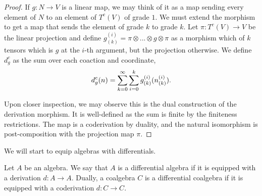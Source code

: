 \documentclass[../thesis.tex]{subfiles}
\begin{document}
\begin{proof}
                If $g: N \rightarrow V$ is a linear map, we may think of it as a map sending every element of $N$ to an element of $T^c(V)$ of grade $1$. We must extend the morphism to get a map that sends the element of grade $k$ to grade $k$. Let $\pi: T^c(V) \rightarrow V$ be the linear projection and define $g_{(k)}^{(i)} = \pi\otimes ... \otimes g \otimes \pi$ as a morphism which of $k$ tensors which is $g$ at the $i$-th argument, but the projection otherwise. We define $d_g^c$ as the sum over each coaction and coordinate,
                \begin{align*}
                    d_g^c(n) = \sum_{k=0}^\infty \sum_{i=0}^k g_{(k)}^{(i)}(n_{(k)}^{(i)})\tt{.}
                \end{align*}
                
                Upon closer inspection, we may observe this is the dual construction of the derivation morphism. It is well-defined as the sum is finite by the finiteness restrictions. The map is a coderivation by duality, and the natural isomorphism is post-composition with the projection map $\pi$.
            \end{proof}

            We will start to equip algebras with differentials.

            \begin{definition}
                Let $A$ be an algebra. We say that $A$ is a differential algebra if it is equipped with a derivation $d: A\rightarrow A$. Dually, a coalgebra $C$ is a differential coalgebra if it is equipped with a coderivation $d: C\rightarrow C$.
            \end{definition}
\end{document}
